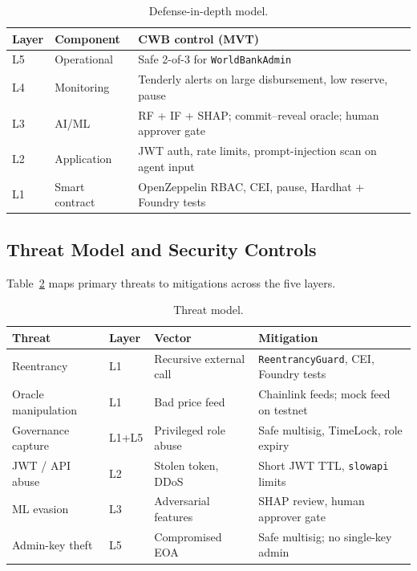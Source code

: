 \documentclass[12pt,a4paper]{report}
\newcommand{\tableheadcolor}{\rowcolor{TableHeadBg}}
\begin{document}
\begin{table}[H]
\centering
\caption[Defense-in-depth model]{Defense-in-depth model.}
\label{tab:defense-layers}
\small
\begin{tabular}{@{}p{1.2cm}p{3.2cm}p{10.0cm}@{}}
\toprule
\tableheadcolor
\textbf{Layer} & \textbf{Component} & \textbf{CWB control (MVT)} \\
\midrule
L5 & Operational & Safe 2-of-3 for \texttt{WorldBankAdmin} \\
L4 & Monitoring & Tenderly alerts on large disbursement, low reserve, pause \\
L3 & AI/ML & RF + IF + SHAP; commit--reveal oracle; human approver gate \\
L2 & Application & JWT auth, rate limits, prompt-injection scan on agent input \\
L1 & Smart contract & OpenZeppelin RBAC, CEI, pause, Hardhat + Foundry tests \\
\bottomrule
\end{tabular}
\end{table}

\subsection{Threat Model and Security Controls}
\label{sec:threat-model}

Table~\ref{tab:threat-model} maps primary threats to mitigations across the five layers.

\begin{table}[H]
\centering
\caption[Threat model]{Threat model.}
\label{tab:threat-model}
\footnotesize
\begin{tabular}{@{}p{2.4cm}p{1.0cm}p{3.2cm}p{6.8cm}@{}}
\toprule
\tableheadcolor
\textbf{Threat} & \textbf{Layer} & \textbf{Vector} & \textbf{Mitigation} \\
\midrule
Reentrancy & L1 & Recursive external call & \texttt{ReentrancyGuard}, CEI, Foundry tests \\
Oracle manipulation & L1 & Bad price feed & Chainlink feeds; mock feed on testnet \\
Governance capture & L1+L5 & Privileged role abuse & Safe multisig, TimeLock, role expiry \\
JWT / API abuse & L2 & Stolen token, DDoS & Short JWT TTL, \texttt{slowapi} limits \\
ML evasion & L3 & Adversarial features & SHAP review, human approver gate \\
Admin-key theft & L5 & Compromised EOA & Safe multisig; no single-key admin \\
\bottomrule
\end{tabular}
\end{table}
\end{document}
